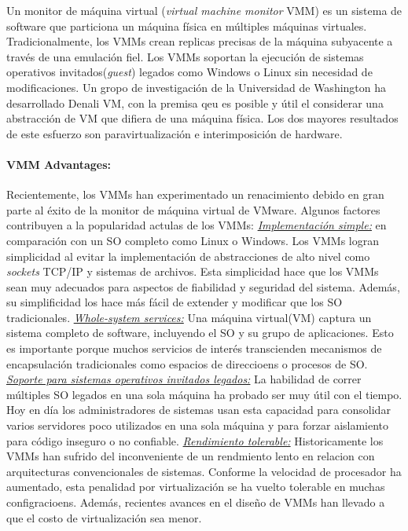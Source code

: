 Un monitor de máquina virtual (\emph{virtual machine monitor} VMM) es un sistema de software que particiona un máquina física en múltiples máquinas virtuales. Tradicionalmente, los VMMs crean replicas precisas de la máquina subyacente a través de una emulación fiel. Los VMMs soportan la ejecución de sistemas operativos invitados(\emph{guest}) legados como Windows o Linux sin necesidad de modificaciones. Un gropo de investigación de la Universidad de Washington ha desarrollado Denali VM, con la premisa qeu es posible y útil el considerar una abstracción de VM que difiera de una máquina física. Los dos mayores resultados de este esfuerzo son paravirtualización e interimposición de hardware. 

\paragraph{\textnormal{\textbf{VMM Advantages:}}}
Recientemente, los VMMs han experimentado un renacimiento debido en gran parte al éxito de la monitor de máquina virtual de VMware. Algunos factores contribuyen a la popularidad actulas de los VMMs: \underline{\emph{Implementación simple:}} en comparación con un SO completo como Linux o Windows. Los VMMs logran simplicidad al evitar la implementación de abstracciones de alto nivel como \emph{sockets} TCP/IP y sistemas de archivos. Esta simplicidad hace que los VMMs sean muy adecuados para aspectos de fiabilidad y seguridad del sistema. Además, su simplificidad los hace más fácil de extender y modificar que los SO tradicionales. \underline{\emph{Whole-system services:}} Una máquina virtual(VM) captura un sistema completo de software, incluyendo el SO y su grupo de aplicaciones. Esto es importante porque muchos servicios de interés transcienden mecanismos de encapsulación tradicionales como espacios de direccioens o procesos de SO. \underline{\emph{Soporte para sistemas operativos invitados legados:}} La habilidad de correr múltiples SO legados en una sola máquina ha probado ser muy útil con el tiempo. Hoy en día los administradores de sistemas usan esta capacidad para consolidar varios servidores poco utilizados en una sola máquina y para forzar aislamiento para código inseguro o no confiable. \underline{\emph{Rendimiento tolerable:}} Historicamente los VMMs han sufrido del inconveniente de un rendmiento lento en relacion con arquitecturas convencionales de sistemas. Conforme la velocidad de procesador ha aumentado, esta penalidad por virtualización se ha vuelto tolerable en muchas configracioens. Además, recientes avances en el diseño de VMMs han llevado a que el costo de virtualización sea menor. 

